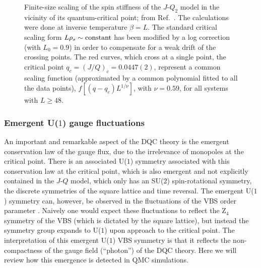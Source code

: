 \documentclass[range]{ar2e}
\begin{document}
\begin{figure}
\centerline{}
\caption{Finite-size scaling of the spin stiffness of the $J$-$Q_2$ model in the vicinity of its quantum-critical point; from Ref.~\cite{Sandvik10c}. The 
calculations were done at inverse temperature $\beta=L$. The standard critical scaling form $L\rho_s \sim {\rm constant}$ has been modified by a log correction 
(with $L_0=0.9$) in order to compensate for a weak drift of the crossing points. The red curves, which cross at a single point, the critical point $q_c=(J/Q)_c = 0.0447(2)$, 
represent a common scaling function (approximated by a common polynomial fitted to all the data points), $f[(q-q_c)L^{1/\nu}]$, with $\nu=0.59$, for all systems 
with $L\ge 48$.}
\label{jqrhos}
\end{figure}

\subsubsection{Emergent U($1$) gauge fluctuations}

An important and remarkable aspect of the DQC theory is the emergent conservation law of the gauge flux, due to the irrelevance of monopoles at the critical point. 
There is an associated U($1$) symmetry associated with this conservation law at the critical point, which is also emergent and not explicitly contained in 
the $J$-$Q$ model, which only has an SU($2$) spin-rotational symmetry, the discrete symmetries of the square lattice and time reversal. The emergent U($1$) 
symmetry can, however, be observed in the fluctuations of the VBS order parameter \cite{Sandvik07}. Naively one would expect these fluctuations 
to reflect the Z$_4$ symmetry of the VBS (which is dictated by the square lattice), but instead the symmetry group expands to U($1$) upon approach to the 
critical point. The interpretation of this emergent U($1$) VBS symmetry is that it reflects the non-compactness of the gauge field (``photon'') 
of the DQC theory. Here we will review how this emergence is detected in QMC simulations.
\end{document}
